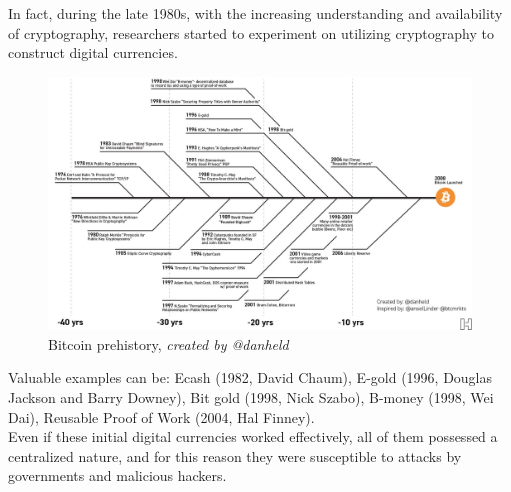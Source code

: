 \noindent In fact, during the late 1980s, with the increasing understanding and availability of cryptography, researchers started to experiment on utilizing cryptography to construct digital currencies. \cite{thebitcoinlegacyprojectBitcoinLegacy}
\begin{figure}[h!]
\centering
\includegraphics[width=14cm]{Figures/bitcoin/bitcoin-prehistory.png}
\caption{Bitcoin prehistory, \textit{created by @danheld}}
\label{fig:bitcoin_prehistory}
\end{figure}
Valuable examples can be: Ecash (1982, David Chaum), E-gold (1996, Douglas Jackson and Barry Downey), Bit gold (1998, Nick Szabo), B-money (1998, Wei Dai), Reusable Proof of Work (2004, Hal Finney).\\
Even if these initial digital currencies worked effectively, all of them possessed a centralized nature, and for this reason they were susceptible to attacks by governments and malicious hackers.\\\\ 
    

